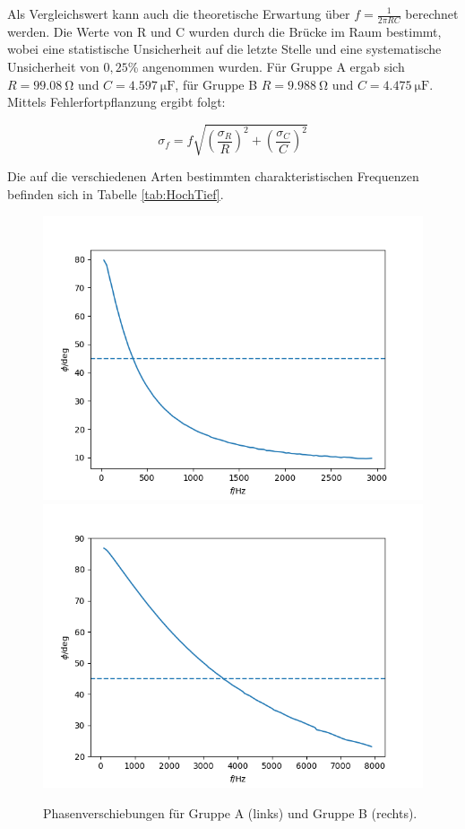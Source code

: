 \documentclass[12pt,a4paper]{article}
\begin{document}
Als Vergleichswert kann auch die theoretische Erwartung über $f = \frac{1}{2\pi RC}$ berechnet werden. Die Werte von R und C wurden durch die Brücke im Raum bestimmt, wobei eine statistische Unsicherheit auf die letzte Stelle und eine systematische Unsicherheit von $0,25$\% angenommen wurden. Für Gruppe A ergab sich $R=\SI{99,08}{\ohm}$ und $C=\SI{4,597}{\micro \F}$, für Gruppe B $R=\SI{9,988}{\ohm}$ und $C=\SI{4,475}{\micro \F}$. Mittels Fehlerfortpflanzung ergibt folgt:

\begin{equation}
\sigma_f = f \sqrt{\left( \frac{\sigma_R}{R} \right)^2+\left( \frac{\sigma_C}{C} \right)^2}
\end{equation}

Die auf die verschiedenen Arten bestimmten charakteristischen Frequenzen befinden sich in Tabelle \ref{tab:HochTief}.

\begin{figure}
\centering
\includegraphics[scale=0.5]{Bilder/PhaseHochTief_A.png}
\includegraphics[scale=0.5]{Bilder/PhaseHochTief_B.png}
\caption{Phasenverschiebungen für Gruppe A (links) und Gruppe B (rechts).}
\label{fig:HochTiefPhase}
\end{figure}
\end{document}
